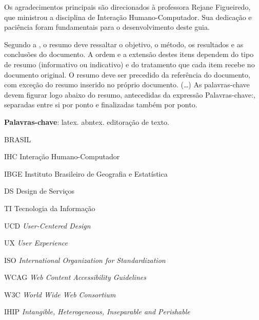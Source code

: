 \documentclass[
  12pt,
  openright,
  twoside,
  a4paper,
  english,
  french,
  spanish,
  brazil
]{abntex2}
\newcommand{\listofquadrosname}{Lista de quadros}
\begin{document}
\frenchspacing

\pretextual
\imprimircapa
\imprimirfolhaderosto*

\begin{agradecimentos}
  Os agradecimentos principais são direcionados à professora Rejane Figueiredo,
  que ministrou a disciplina de Interação Humano-Computador. Sua dedicação e
  paciência foram fundamentais para o desenvolvimento deste guia.
\end{agradecimentos}


\setlength{\absparsep}{18pt} %
\begin{resumo}
 Segundo a , o resumo deve ressaltar o
 objetivo, o método, os resultados e as conclusões do documento. A ordem e a extensão
 destes itens dependem do tipo de resumo (informativo ou indicativo) e do
 tratamento que cada item recebe no documento original. O resumo deve ser
 precedido da referência do documento, com exceção do resumo inserido no
 próprio documento. (\ldots) As palavras-chave devem figurar logo abaixo do
 resumo, antecedidas da expressão Palavras-chave:, separadas entre si por
 ponto e finalizadas também por ponto.

 \textbf{Palavras-chave}: latex. abntex. editoração de texto.
\end{resumo}BRASIL
\cleardoublepage

\pdfbookmark[0]{\listofquadrosname}{loq}
\listofquadros*
\cleardoublepage

\listoftables*
\cleardoublepage

\begin{siglas}
  \item[IHC] Interação Humano-Computador
  \item[IBGE] Instituto Brasileiro de Geografia e Estatística
  \item[DS] Design de Serviços
  \item[TI] Tecnologia da Informação
  \item[UCD] \textit{User-Centered Design}
  \item[UX] \textit{User Experience}
  \item[ISO] \textit{International Organization for Standardization}
  \item[WCAG] \textit{Web Content Accessibility Guidelines}
  \item[W3C] \textit{World Wide Web Consortium}
  \item[IHIP] \textit{Intangible, Heterogeneous, Inseparable and Perishable}
\end{siglas}
\end{document}

